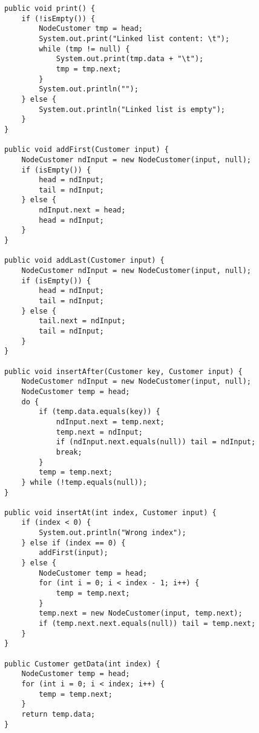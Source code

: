 \documentclass[12pt,titlepage]{article}
\begin{document}
\begin{enumerate}
\begin{verbatim}
            public void print() {
                if (!isEmpty()) {
                    NodeCustomer tmp = head;
                    System.out.print("Linked list content: \t");
                    while (tmp != null) {
                        System.out.print(tmp.data + "\t");
                        tmp = tmp.next;
                    }
                    System.out.println("");
                } else {
                    System.out.println("Linked list is empty");
                }
            }

            public void addFirst(Customer input) {
                NodeCustomer ndInput = new NodeCustomer(input, null);
                if (isEmpty()) {
                    head = ndInput;
                    tail = ndInput;
                } else {
                    ndInput.next = head;
                    head = ndInput;
                }
            }

            public void addLast(Customer input) {
                NodeCustomer ndInput = new NodeCustomer(input, null);
                if (isEmpty()) {
                    head = ndInput;
                    tail = ndInput;
                } else {
                    tail.next = ndInput;
                    tail = ndInput;
                }
            }

            public void insertAfter(Customer key, Customer input) {
                NodeCustomer ndInput = new NodeCustomer(input, null);
                NodeCustomer temp = head;
                do {
                    if (temp.data.equals(key)) {
                        ndInput.next = temp.next;
                        temp.next = ndInput;
                        if (ndInput.next.equals(null)) tail = ndInput;
                        break;
                    }
                    temp = temp.next;
                } while (!temp.equals(null));
            }

            public void insertAt(int index, Customer input) {
                if (index < 0) {
                    System.out.println("Wrong index");
                } else if (index == 0) {
                    addFirst(input);
                } else {
                    NodeCustomer temp = head;
                    for (int i = 0; i < index - 1; i++) {
                        temp = temp.next;
                    }
                    temp.next = new NodeCustomer(input, temp.next);
                    if (temp.next.next.equals(null)) tail = temp.next;
                }
            }

            public Customer getData(int index) {
                NodeCustomer temp = head;
                for (int i = 0; i < index; i++) {
                    temp = temp.next;
                }
                return temp.data;
            }


\end{verbatim}
\end{enumerate}
\end{document}
